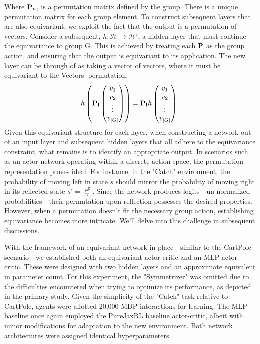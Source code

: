 Where $\mathbf{P}_n$, is a permutation matrix defined by the group. There is a unique permutation matrix for each group element. To construct subsequent layers that are also equivariant, we exploit the fact that the output is a permutation of vectors. Consider a subsequent, $h: \mathcal{H} \rightarrow \mathcal{H}'$, a hidden layer that must continue the equivariance to group G. This is achieved by treating each $\mathbf{P}$ as the group action, and ensuring that the output is equivariant to its application. The new layer can be through of as taking a vector of vectors, where it must be equivariant to the Vectors' permutation,
\begin{equation}
	h\left( \mathbf{P_i}
	\begin{pmatrix}
		v_1    \\
		v_2    \\
		\vdots \\
		v_{|G|}
	\end{pmatrix}
	\right) = \mathbf{P_i} h
	\begin{pmatrix}
		v_1    \\
		v_2    \\
		\vdots \\
		v_{|G|}
	\end{pmatrix}.
\end{equation}
Given this equivariant structure for each layer, when constructing a network out of an input layer and subsequent hidden layers that all adhere to the equivariance constraint, what remains is to identify an appropriate output. In scenarios such as an actor network operating within a discrete action space, the permutation representation proves ideal. For instance, in the "Catch" environment, the probability of moving left in state \( s \) should mirror the probability of moving right in its reflected state \( s' = \ell_r^\mathcal{S} \). Since the network produces logits—un-normalized probabilities—their permutation upon reflection possesses the desired properties. However, when a permutation doesn't fit the necessary group action, establishing equivariance becomes more intricate. We'll delve into this challenge in subsequent discussions.

With the framework of an equivariant network in place—similar to the CartPole scenario—we established both an equivariant actor-critic and an MLP actor-critic. These were designed with two hidden layers and an approximate equivalent in parameter count. For this experiment, the "Symmetrizer" was omitted due to the difficulties encountered when trying to optimize its performance, as depicted in the primary study. Given the simplicity of the "Catch" task relative to CartPole, agents were allotted 20,000 MDP interactions for learning. The MLP baseline once again employed the PureJaxRL baseline actor-critic, albeit with minor modifications for adaptation to the new environment. Both network architectures were assigned identical hyperparameters.

